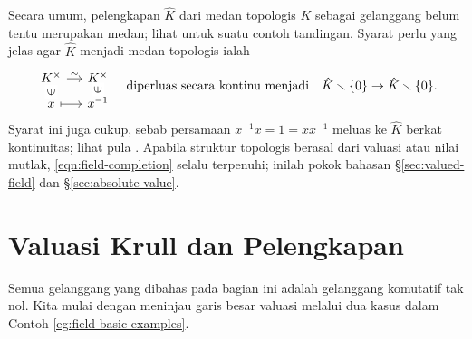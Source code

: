 Secara umum, pelengkapan $\hat{K}$ dari medan topologis $K$ sebagai gelanggang belum tentu merupakan medan; lihat \cite[Example 8.59]{Str06} untuk suatu contoh tandingan. Syarat perlu yang jelas agar $\hat{K}$ menjadi medan topologis ialah
\begin{equation}\label{eqn:field-completion}
	\begin{tikzcd}[row sep=tiny, column sep=small]
		K^\times \arrow[r, "\sim"] & K^\times \\
		x \arrow[mapsto, r] \arrow[sloped, phantom, u, "\in" description] & x^{-1} \arrow[sloped, phantom, u, "\in" description]
	\end{tikzcd}
	 \quad\text{diperluas secara kontinu menjadi}\quad \hat{K} \smallsetminus \{0\} \to \hat{K} \smallsetminus \{0\}.
\end{equation}
Syarat ini juga cukup, sebab persamaan $x^{-1}x=1=xx^{-1}$ meluas ke $\hat{K}$ berkat kontinuitas; lihat pula \cite[III.6, Proposition 7]{Bou-Top1}. Apabila struktur topologis berasal dari valuasi atau nilai mutlak, \eqref{eqn:field-completion} selalu terpenuhi; inilah pokok bahasan \S\ref{sec:valued-field} dan \S\ref{sec:absolute-value}.

\section{Valuasi Krull dan Pelengkapan}\label{sec:Krull-valuation}
Semua gelanggang yang dibahas pada bagian ini adalah gelanggang komutatif tak nol. Kita mulai dengan meninjau garis besar valuasi melalui dua kasus dalam Contoh \ref{eg:field-basic-examples}.

